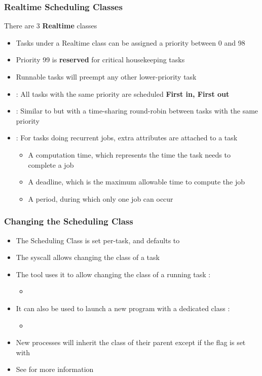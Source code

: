 \begin{frame}
	\frametitle{Realtime Scheduling Classes}
	There are 3 \textbf{Realtime} classes
	\begin{itemize}
		\item Tasks under a Realtime class can be assigned a priority between 0 and 98
		\item Priority 99 is \textbf{reserved} for critical housekeeping tasks
		\item Runnable tasks will preempt any other lower-priority task
		\item {} : All tasks with the same priority are scheduled \textbf{First in, First out}
		\item {} : Similar to  but with a time-sharing round-robin between tasks with the same priority
		\item {} : For tasks doing recurrent jobs, extra attributes are attached to a task
			\begin{itemize}
				\item A computation time, which represents the time the task needs to complete a job
				\item A deadline, which is the maximum allowable time to compute the job
				\item A period, during which only one job can occur
			\end{itemize}
	\end{itemize}
\end{frame}

\begin{frame}
	\frametitle{Changing the Scheduling Class}
	\begin{itemize}
		\item The Scheduling Class is set per-task, and defaults to 
		\item The  syscall allows changing the class of a task
		\item The tool  uses it to allow changing the class of a running task :
			\begin{itemize}
				\item {}
			\end{itemize}
		\item It can also be used to launch a new program with a dedicated class :
			\begin{itemize}
				\item {}
			\end{itemize}
		\item New processes will inherit the class of their parent except if the  flag is set with 
		\item See  for more information
	\end{itemize}
\end{frame}
